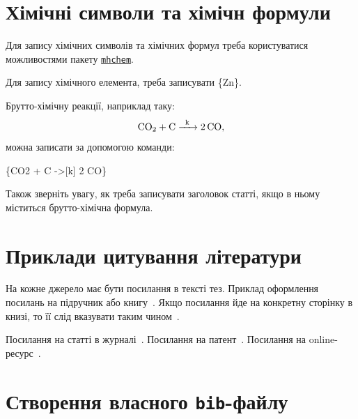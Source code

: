 \documentclass[]{iptconf}
\begin{document}
\section{Хімічні символи та хімічн формули}





Для запису хімічних символів та хімічних формул треба користуватися можливостями пакету \href{https://www.ctan.org/pkg/mhchem}{\texttt{mhchem}}.

Для запису хімічного елемента, треба записувати \string\ce\{Zn\}.

Брутто-хімічну реакції, наприклад таку:
\begin{equation*}
	\ce{CO2 + C ->[k] 2 CO},
\end{equation*}
можна записати за допомогою команди:
\begin{center}
	\string\ce\{CO2 + C ->[k] 2 CO\}
\end{center}

Також зверніть увагу, як треба записувати заголовок статті, якщо в ньому міститься брутто-хімічна формула.





\section{Приклади цитування літератури}





На кожне джерело має бути посилання в тексті тез. Приклад оформлення посилань на підручник або книгу~\cite{ZeeGeneralRelativity, Siv1, FLFP}. Якщо посилання йде на конкретну сторінку в книзі, то її слід вказувати таким чином~\cite[стор. 120]{Siv1}.

Посилання на статті в журналі~\cite{Hanson, CookPhysTime, astro-ph/9801252}. Посилання на патент~\cite{patent}. Посилання на online-ресурс~\cite{leinster}.





\section{Створення власного \texttt{bib}-файлу}
\end{document}
